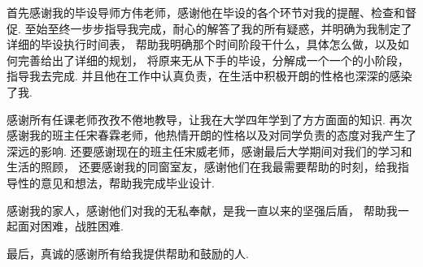 \documentclass[bachelor,adobefonts]{jnuthesis}
\begin{document}
\nocite{*}

%
%

\begin{acknowledgement}
  首先感谢我的毕设导师方伟老师，感谢他在毕设的各个环节对我的提醒、检查和督促.
  至始至终一步步指导我完成，耐心的解答了我的所有疑惑，并明确为我制定了详细的毕设执行时间表，
  帮助我明确那个时间阶段干什么，具体怎么做，以及如何完善给出了详细的规划，
  将原来无从下手的毕设，分解成一个一个的小阶段，指导我去完成.
  并且他在工作中认真负责，在生活中积极开朗的性格也深深的感染了我.
  
  感谢所有任课老师孜孜不倦地教导，让我在大学四年学到了方方面面的知识.
  再次感谢我的班主任宋春霖老师，他热情开朗的性格以及对同学负责的态度对我产生了深远的影响.
  还要感谢现在的班主任宋威老师，感谢最后大学期间对我们的学习和生活的照顾，
  还要感谢我的同窗室友，感谢他们在我最需要帮助的时刻，给我指导性的意见和想法，帮助我完成毕业设计.
  
  感谢我的家人，感谢他们对我的无私奉献，是我一直以来的坚强后盾，
  帮助我一起面对困难，战胜困难.
  
  最后，真诚的感谢所有给我提供帮助和鼓励的人.
\end{acknowledgement}

\backmatter




\end{document}

